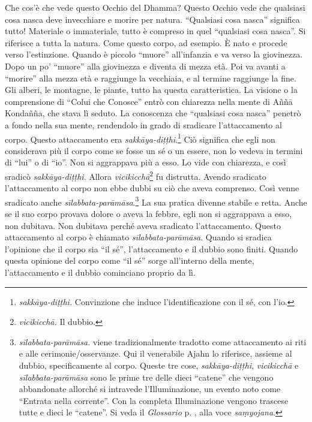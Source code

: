 Che cos'è che vede questo Occhio del Dhamma? Questo Occhio vede che
qualsiasi cosa nasca deve invecchiare e morire per natura. ``Qualsiasi
cosa nasca'' significa tutto! Materiale o immateriale, tutto è compreso
in quel ``qualsiasi cosa nasca''. Si riferisce a tutta la natura. Come
questo corpo, ad esempio. È nato e procede verso l'estinzione. Quando è
piccolo ``muore'' all'infanzia e va verso la giovinezza. Dopo un po'
``muore'' alla giovinezza e diventa di mezza età. Poi va avanti a
``morire'' alla mezza età e raggiunge la vecchiaia, e al termine
raggiunge la fine. Gli alberi, le montagne, le piante, tutto ha questa
caratteristica. La visione o la comprensione di ``Colui che Conosce''
entrò con chiarezza nella mente di Aññā Kondañña, che stava lì seduto.
La conoscenza che ``qualsiasi cosa nasca'' penetrò a fondo nella sua
mente, rendendolo in grado di sradicare l'attaccamento al corpo. Questo
attaccamento era \emph{sakkāya-diṭṭhi}.\footnote{\emph{sakkāya-diṭṭhi.}
  Convinzione che induce l'identificazione con il sé, con l'io.} Ciò
significa che egli non considerava più il corpo come se fosse un sé o un
essere, non lo vedeva in termini di ``lui'' o di ``io''. Non si
aggrappava più a esso. Lo vide con chiarezza, e così sradicò
\emph{sakkāya-diṭṭhi}. Allora \emph{vicikicchā}\footnote{\emph{vicikicchā.}
  Il dubbio.} fu distrutta. Avendo sradicato l'attaccamento al corpo non
ebbe dubbi su ciò che aveva comprenso. Così venne sradicato anche
\emph{sīlabbata-parāmāsa}.\footnote{\emph{sīlabbata-parāmāsa.} viene
  tradizionalmente tradotto come attaccamento ai riti e alle
  cerimonie/osservanze. Qui il venerabile Ajahn lo riferisce, assieme al
  dubbio, specificamente al corpo. Queste tre cose,
  \emph{sakkāya-diṭṭhi}, \emph{vicikicchā} e \emph{sīlabbata-parāmāsa}
  sono le prime tre delle dieci ``catene'' che vengono abbandonate
  allorché si intravede l'Illuminazione, un evento noto come ``Entrata
  nella corrente''. Con la completa Illuminazione vengono trascese tutte
  e dieci le ``catene''. Si veda il \emph{Glossario} p. \pageref{glossary-samyojana}, alla voce
  \emph{saṃyojana}.} La sua pratica divenne stabile e retta. Anche se il
suo corpo provava dolore o aveva la febbre, egli non si aggrappava a
esso, non dubitava. Non dubitava perché aveva sradicato l'attaccamento.
Questo attaccamento al corpo è chiamato \emph{sīlabbata-parāmāsa}.
Quando si sradica l'opinione che il corpo sia ``il sé'', l'attaccamento
e il dubbio sono finiti. Quando questa opinione del corpo come ``il sé''
sorge all'interno della mente, l'attaccamento e il dubbio cominciano
proprio da lì.

